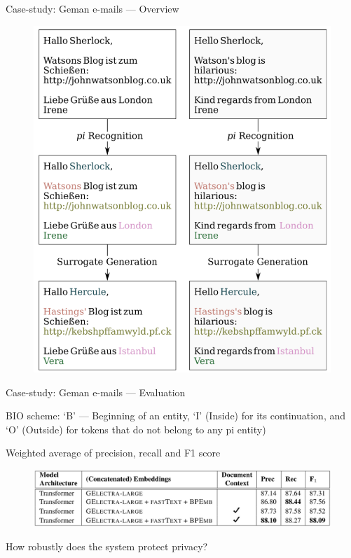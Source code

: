 \documentclass[12pt,aspectratio=169,handout]{beamer}
\begin{document}
\begin{frame}{Case-study: Geman e-mails --- Overview}

\begin{figure}
\includegraphics[width=0.50\linewidth]{img/eder-et-al-1.png}
\end{figure}


\end{frame}


\begin{frame}{Case-study: Geman e-mails --- Evaluation}

BIO scheme: `B' --- Beginning of an entity, `I' (Inside) for its continuation, and ‘O’ (Outside) for tokens that do not belong to any pi entity)

Weighted average of precision, recall and F1 score

\begin{figure}
\includegraphics[width=\linewidth]{img/eder-et-al-3}
\end{figure}

How robustly does the system protect privacy?


\end{frame}
\end{document}
